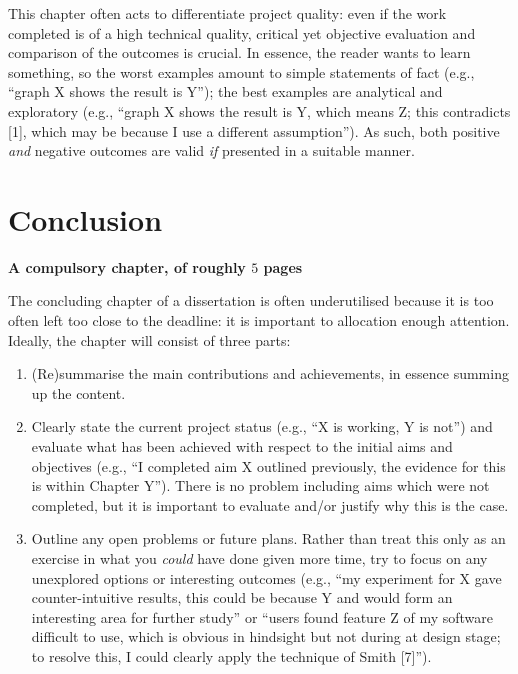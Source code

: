 \documentclass[
    author={Jacob Daniel Halsey},
    supervisor={Prof. Awais Rashid},
    degree={BSc},
    title={Building a Testbed for Evaluating Privacy Enhancing Technologies  (PETs)},
    subtitle={},
    type={software development},
    year={2021}
]{dissertation}
\begin{document}
\noindent
This chapter often acts to differentiate project quality: even if the work
completed is of a high technical quality, critical yet objective evaluation 
and comparison of the outcomes is crucial.  In essence, the reader wants to
learn something, so the worst examples amount to simple statements of fact 
(e.g., ``graph X shows the result is Y''); the best examples are analytical 
and exploratory (e.g., ``graph X shows the result is Y, which means Z; this 
contradicts [1], which may be because I use a different assumption'').  As 
such, both positive {\em and} negative outcomes are valid {\em if} presented 
in a suitable manner.

\chapter{Conclusion}
\label{chap:conclusion}

{\bf A compulsory chapter,     of roughly $5$ pages} 
\vspace{1cm} 

\noindent
The concluding chapter of a dissertation is often underutilised because it 
is too often left too close to the deadline: it is important to allocation
enough attention.  Ideally, the chapter will consist of three parts:

\begin{enumerate}
\item (Re)summarise the main contributions and achievements, in essence
      summing up the content.
\item Clearly state the current project status (e.g., ``X is working, Y 
      is not'') and evaluate what has been achieved with respect to the 
      initial aims and objectives (e.g., ``I completed aim X outlined 
      previously, the evidence for this is within Chapter Y'').  There 
      is no problem including aims which were not completed, but it is 
      important to evaluate and/or justify why this is the case.
\item Outline any open problems or future plans.  Rather than treat this
      only as an exercise in what you {\em could} have done given more 
      time, try to focus on any unexplored options or interesting outcomes
      (e.g., ``my experiment for X gave counter-intuitive results, this 
      could be because Y and would form an interesting area for further 
      study'' or ``users found feature Z of my software difficult to use,
      which is obvious in hindsight but not during at design stage; to 
      resolve this, I could clearly apply the technique of Smith [7]'').
\end{enumerate}

\backmatter
\printbibliography
\end{document}
